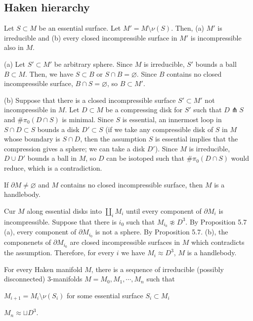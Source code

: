 \documentclass{../../small}
\begin{document}
\subsection{Haken hierarchy}

\begin{prop}
Let $S\subset M$ be an essential surface.
Let $M'=M\setminus\nu(S)$.
Then, (a) $M'$ is irreducible and (b) every closed incompressible surface in $M'$ is incompressible also in $M$.
\end{prop}
\begin{pf}
(a)
Let $S'\subset M'$ be arbitrary sphere.
Since $M$ is irreducible, $S'$ bounds a ball $B\subset M$.
Then, we have $S\subset B$ or $S\cap B=\varnothing$.
Since $B$ contains no closed incompressible surface, $B\cap S=\varnothing$, so $B\subset M'$.

(b)
Suppose that there is a closed incompressible surface $S'\subset M'$ not incompressible in $M$.
Let $D\subset M$ be a compressing disk for $S'$ such that $D\pitchfork S$ and $\#\pi_0(D\cap S)$ is minimal.
Since $S$ is essential, an innermost loop in $S\cap D\subset S$ bounds a disk $D'\subset S$ (if we take any compressible disk of $S$ in $M$ whose boundary is $S\cap D$, then the assumption $S$ is essential implies that the compression gives a sphere; we can take a disk $D'$).
Since $M$ is irreducible, $D\cup D'$ bounds a ball in $M$, so $D$ can be isotoped such that $\#\pi_0(D\cap S)$ would reduce, which is a contradiction.
\end{pf}

\begin{prop}
If $\partial M\ne\varnothing$ and $M$ contains no closed incompressible surface, then $M$ is a handlebody.
\begin{pf}
Cur $M$ along essential disks into $\coprod_iM_i$ until every component of $\partial M_i$ is incompressible.
Suppose that there is $i_0$ such that $M_{i_0}\not\approx D^3$.
By Proposition 5.7 (a), every component of $\partial M_{i_0}$ is not a sphere.
By Proposition 5.7. (b), the componenets of $\partial M_{i_0}$ are closed incompressible surfaces in $M$ which contradicts the assumption.
Therefore, for every $i$ we have $M_i\approx D^3$, $M$ is a handlebody.
\end{pf}
\end{prop}

\begin{thm}
For every Haken manifold $M$, there is a sequence of irreducible (possibly disconnected) 3-manifolds $M=M_0,M_1,\cdots,M_n$ such that
\begin{parts}
	\item $M_{i+1}=M_i\setminus\nu(S_i)$ for some essential surface $S_i\subset M_i$
	\item $M_n\approx \sqcup D^3$.
\end{parts}
\end{thm}
\end{document}
